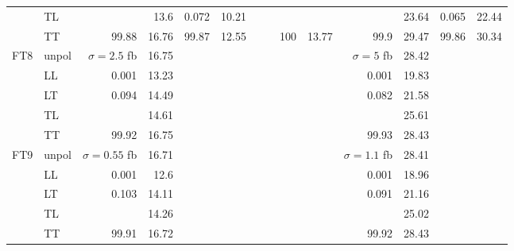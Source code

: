 \begin{table}[h]
{\begin{tabular}{llrrrrrrrrrrrr}
 & TL &  & \num{13.6} & \num{0.072} & \num{10.21} &  &  &  &  &  & \num{23.64} & \num{0.065} & \num{22.44} \\
 & TT & \num{99.88} & \num{16.76} & \num{99.87} & \num{12.55} &  &  & \num{100} & \num{13.77} & \num{99.9} & \num{29.47} & \num{99.86} & \num{30.34} \\
\midrule
\multirow{5}{*}{FT8}
 & unpol & $\sigma = \num{2.5}$ fb & \num{16.75} &  &  &  &  &  &  & $\sigma = \num{5}$ fb & \num{28.42} &  &  \\
 & LL & \num{0.001} & \num{13.23} &  &  &  &  &  &  & \num{0.001} & \num{19.83} &  &  \\
 & LT & \num{0.094} & \num{14.49} &  &  &  &  &  &  & \num{0.082} & \num{21.58} &  &  \\
 & TL &  & \num{14.61} &  &  &  &  &  &  &  & \num{25.61} &  &  \\
 & TT & \num{99.92} & \num{16.75} &  &  &  &  &  &  & \num{99.93} & \num{28.43} &  &  \\
\midrule
\multirow{5}{*}{FT9}
 & unpol & $\sigma = \num{0.55}$ fb & \num{16.71} &  &  &  &  &  &  & $\sigma = \num{1.1}$ fb & \num{28.41} &  &  \\
 & LL & \num{0.001} & \num{12.6} &  &  &  &  &  &  & \num{0.001} & \num{18.96} &  &  \\
 & LT & \num{0.103} & \num{14.11} &  &  &  &  &  &  & \num{0.091} & \num{21.16} &  &  \\
 & TL &  & \num{14.26} &  &  &  &  &  &  &  & \num{25.02} &  &  \\
 & TT & \num{99.91} & \num{16.72} &  &  &  &  &  &  & \num{99.92} & \num{28.43} &  &  \\
\bottomrule
\end{tabular}
}%
\end{table}
\newpage
